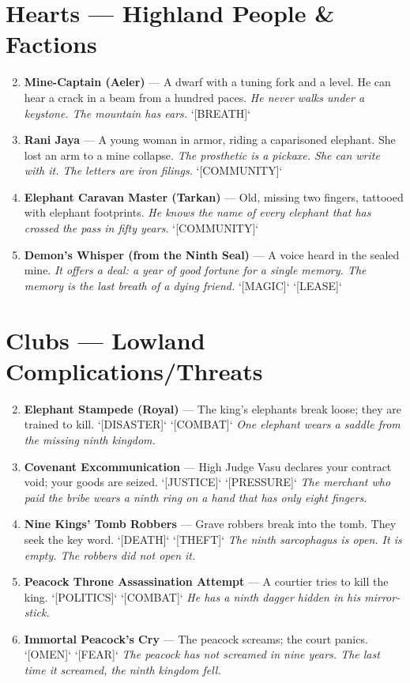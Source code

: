 \section*{Hearts --- Highland People \& Factions}
\label{sec:dhahara-highland-people}
\begin{enumerate}
\setcounter{enumi}{1}
\item \textbf{Mine-Captain (Aeler)} --- A dwarf with a tuning fork and a level. He can hear a crack in a beam from a hundred paces.
  \hfill \textit{He never walks under a keystone. The mountain has ears.} `[BREATH]`
\item \textbf{Rani Jaya} --- A young woman in armor, riding a caparisoned elephant. She lost an arm to a mine collapse.
  \hfill \textit{The prosthetic is a pickaxe. She can write with it. The letters are iron filings.} `[COMMUNITY]`
\item \textbf{Elephant Caravan Master (Tarkan)} --- Old, missing two fingers, tattooed with elephant footprints.
  \hfill \textit{He knows the name of every elephant that has crossed the pass in fifty years.} `[COMMUNITY]`
\item \textbf{Demon's Whisper (from the Ninth Seal)} --- A voice heard in the sealed mine.
  \hfill \textit{It offers a deal: a year of good fortune for a single memory. The memory is the last breath of a dying friend.} `[MAGIC]` `[LEASE]`
\end{enumerate}

\section*{Clubs --- Lowland Complications/Threats}
\label{sec:dhahara-lowland-complications}
\begin{enumerate}
\setcounter{enumi}{1}
\item \textbf{Elephant Stampede (Royal)} --- The king's elephants break loose; they are trained to kill. `[DISASTER]` `[COMBAT]`
  \hfill \textit{One elephant wears a saddle from the missing ninth kingdom.}
\item \textbf{Covenant Excommunication} --- High Judge Vasu declares your contract void; your goods are seized. `[JUSTICE]` `[PRESSURE]`
  \hfill \textit{The merchant who paid the bribe wears a ninth ring on a hand that has only eight fingers.}
\item \textbf{Nine Kings' Tomb Robbers} --- Grave robbers break into the tomb. They seek the key word. `[DEATH]` `[THEFT]`
  \hfill \textit{The ninth sarcophagus is open. It is empty. The robbers did not open it.}
\item \textbf{Peacock Throne Assassination Attempt} --- A courtier tries to kill the king. `[POLITICS]` `[COMBAT]`
  \hfill \textit{He has a ninth dagger hidden in his mirror-stick.}
\item \textbf{Immortal Peacock's Cry} --- The peacock screams; the court panics. `[OMEN]` `[FEAR]`
  \hfill \textit{The peacock has not screamed in nine years. The last time it screamed, the ninth kingdom fell.}
\end{enumerate}

